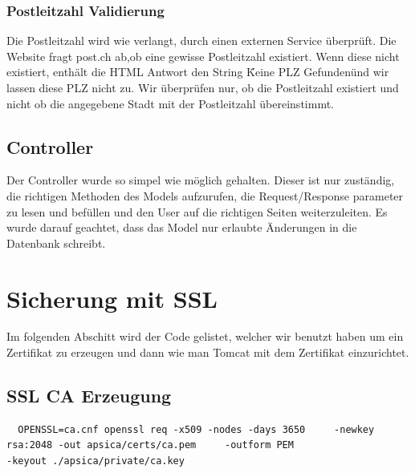 \documentclass[10pt]{scrartcl}
\begin{document}
\subsubsection{Postleitzahl Validierung}
Die Postleitzahl wird wie verlangt, durch einen externen Service überprüft. Die Website fragt post.ch ab,ob eine gewisse Postleitzahl existiert. Wenn diese nicht existiert, enthält die HTML Antwort den String \"Keine PLZ Gefunden\" und wir lassen diese PLZ nicht zu. Wir überprüfen nur, ob die Postleitzahl existiert und nicht ob die angegebene Stadt mit der Postleitzahl übereinstimmt. 

\subsection{Controller}
Der Controller wurde so simpel wie möglich gehalten. Dieser ist nur zuständig, die richtigen Methoden des Models aufzurufen, die Request/Response parameter zu lesen und befüllen und den User auf die richtigen Seiten weiterzuleiten. Es wurde darauf geachtet, dass das Model nur erlaubte Änderungen in die Datenbank schreibt.


\section{Sicherung mit SSL}
Im folgenden Abschitt wird der Code gelistet, welcher wir benutzt haben um ein Zertifikat zu erzeugen und dann wie man Tomcat mit dem Zertifikat einzurichtet.

\subsection{SSL CA Erzeugung}
\begin{verbatim}
  OPENSSL=ca.cnf openssl req -x509 -nodes -days 3650     -newkey rsa:2048 -out apsica/certs/ca.pem     -outform PEM 
-keyout ./apsica/private/ca.key

\end{verbatim}
\end{document}
